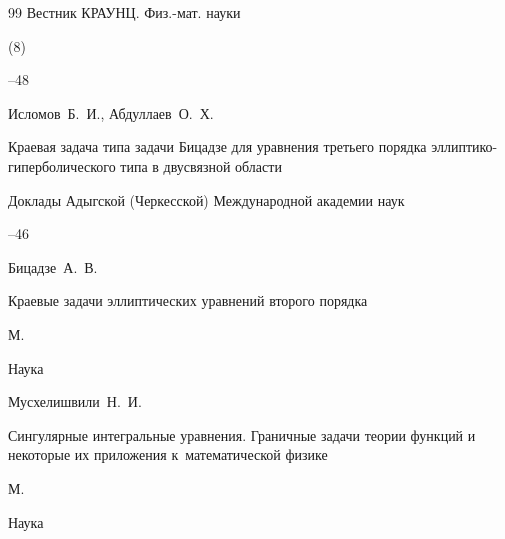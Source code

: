 \begin{thebibliography}{99}
\jour Вестник КРАУНЦ. Физ.-мат. науки


(8)

--48






 


\by Исломов~Б.~И., Абдуллаев~О.~Х.

\paper Краевая задача типа задачи Бицадзе для уравнения третьего порядка эллиптико-гиперболического типа в двусвязной области

\jour Доклады Адыгской (Черкесской) Международной академии наук




--46





\by Бицадзе~А.~В.

\book Краевые задачи эллиптических уравнений второго порядка

\publaddr М.

\publ Наука






















\by Мусхелишвили~Н.~И.

\book Сингулярные интегральные уравнения. Граничные задачи теории функций и некоторые их приложения к~математической физике


\publaddr М.

\publ Наука











\end{thebibliography}



